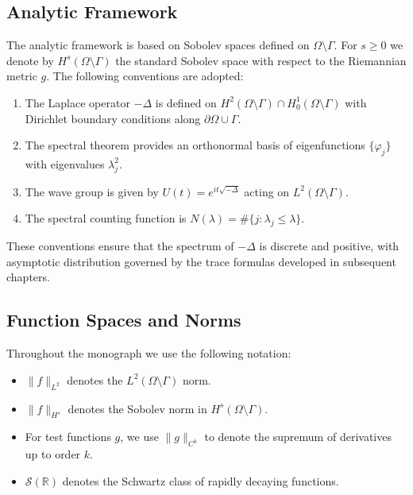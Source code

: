 \subsection{Analytic Framework}

The analytic framework is based on Sobolev spaces defined on
$\Omega\setminus\Gamma$. For $s \geq 0$ we denote by $H^s(\Omega\setminus\Gamma)$
the standard Sobolev space with respect to the Riemannian metric $g$. The
following conventions are adopted:

\begin{enumerate}[label=(A\arabic*)]
  \item The Laplace operator $-\Delta$ is defined on
  $H^2(\Omega\setminus\Gamma)\cap H^1_0(\Omega\setminus\Gamma)$ with Dirichlet
  boundary conditions along $\partial\Omega \cup \Gamma$.
  \item The spectral theorem provides an orthonormal basis of eigenfunctions
  $\{\varphi_j\}$ with eigenvalues $\lambda_j^2$.
  \item The wave group is given by $U(t) = e^{it\sqrt{-\Delta}}$ acting on
  $L^2(\Omega\setminus\Gamma)$.
  \item The spectral counting function is
  $N(\lambda) = \#\{ j : \lambda_j \leq \lambda\}$.
\end{enumerate}

These conventions ensure that the spectrum of $-\Delta$ is discrete and
positive, with asymptotic distribution governed by the trace formulas
developed in subsequent chapters.

\subsection{Function Spaces and Norms}

Throughout the monograph we use the following notation:

\begin{itemize}
  \item $\|f\|_{L^2}$ denotes the $L^2(\Omega\setminus\Gamma)$ norm.
  \item $\|f\|_{H^s}$ denotes the Sobolev norm in $H^s(\Omega\setminus\Gamma)$.
  \item For test functions $g$, we use $\|g\|_{C^k}$ to denote the supremum of
  derivatives up to order $k$.
  \item $\mathcal{S}(\mathbb{R})$ denotes the Schwartz class of rapidly
  decaying functions.
\end{itemize}

